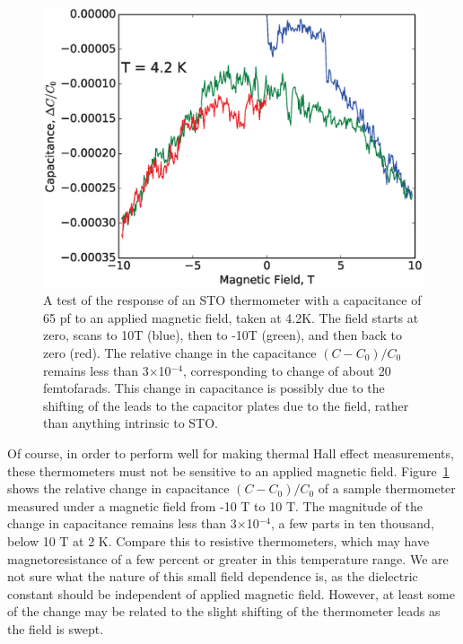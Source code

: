 \documentclass{thesis-umich}
\begin{document}
\begin{figure} \caption[Field Response of an STO Thermometer]{A test of the response of an STO thermometer with a capacitance of 65 pf to an
    applied magnetic field, taken at 4.2K.  The field starts at zero, scans to
    10T (blue), then to -10T (green), and then back to zero (red).  The relative
    change in the capacitance $(C - C_0)/C_0$ remains less than
  3$\times$10$^{-4}$, corresponding to change of about 20 femtofarads. This
change in capacitance is possibly due to the shifting of the leads to the
capacitor plates due to the field, rather than anything intrinsic to STO.}\label{fig:b_test}
\centering \includegraphics[width=\columnwidth]{figures/cvb_apl.eps}
\end{figure}

Of course, in order to perform well for making thermal Hall effect measurements,
these thermometers must not be sensitive to an applied magnetic field.
Figure~\ref{fig:b_test} shows the relative change in capacitance $(C-C_0)/C_0$ of a
sample thermometer measured under a magnetic field from -10 T to 10 T.  The
magnitude of the change in capacitance remains less than 3$\times$10$^{-4}$, a
few parts in ten thousand, below 10 T at 2 K. Compare this to resistive
thermometers, which may have magnetoresistance of a few percent or greater in
this temperature range\cite{Heine1998,Goodrich1998}. We are not sure what the nature
of this small field dependence is, as the dielectric constant should be
independent of applied magnetic field. However, at least some of the change may
be related to the slight shifting of the thermometer leads as the field is
swept.
\end{document}
